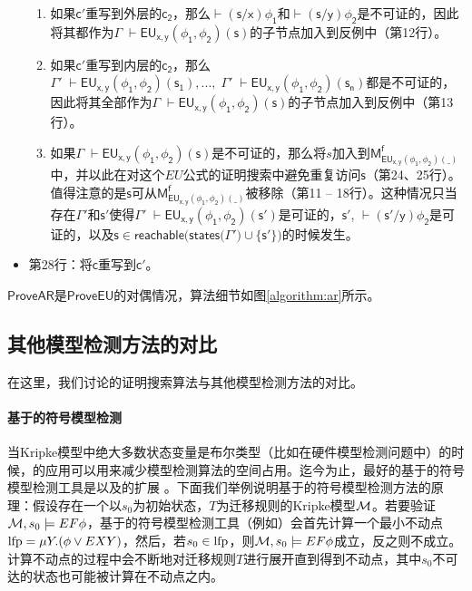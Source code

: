 \begin{itemize}
\begin{enumerate}
		\item 如果$\mathsf{c'}$重写到外层的$\mathsf{c_2}$，那么$\mathsf{\vdash (s/x)\phi_1}$和$\mathsf{\vdash (s/y)\phi_2}$是不可证的，因此将其都作为$\Gamma\;\mathsf{\vdash EU_{x,y}(\phi_1,\phi_2)(s)}$的子节点加入到反例中（第12行）。
		\item 如果$\mathsf{c'}$重写到内层的$\mathsf{c_2}$，那么$\Gamma'\;\mathsf{\vdash EU_{x,y}(\phi_1,\phi_2)(s_1)},...,\;\Gamma'\;\mathsf{\vdash EU_{x,y}(\phi_1,\phi_2)(s_n)}$都是不可证的，因此将其全部作为$\Gamma\;\mathsf{\vdash EU_{x,y}(\phi_1,\phi_2)(s)}$的子节点加入到反例中（第13行）。
		\item 如果$\Gamma\;\mathsf{\vdash EU_{x,y}(\phi_1,\phi_2)(s)}$是不可证的，那么将$s$加入到$\mathsf{M_{EU_{x,y}(\phi_1,\phi_2)(\_)}^f}$中，并以此在对这个$EU$公式的证明搜索中避免重复访问$\mathsf{s}$（第24、25行）。值得注意的是$\mathsf{s}$可从$\mathsf{M_{EU_{x,y}(\phi_1,\phi_2)(\_)}^f}$被移除（第11 -- 18行）。这种情况只当存在${\Gamma'}$和$\mathsf{s'}$使得$\Gamma'\;\mathsf{\vdash EU_{x,y}(\phi_1,\phi_2)(s')}$是可证的，$\mathsf{s'}$, $\mathsf{\vdash (s'/y)\phi_2}$是可证的，以及$\mathsf{s\in reachable(states(}\Gamma'\mathsf{)\cup \{s'\})}$的时候发生。
		
	\end{enumerate}
	\item 第28行：将$\mathsf{c}$重写到$\mathsf{c'}$。
\end{itemize}

$\mathsf{ProveAR}$是$\mathsf{ProveEU}$的对偶情况，算法细节如图\ref{algorithm:ar}所示。


\subsection{其他\CTLP{}模型检测方法的对比}
在这里，我们讨论\sctlprov{}的证明搜索算法与其他\CTLP{}模型检测方法的对比。

\paragraph{基于\BDD{}的符号模型检测}
当Kripke模型中绝大多数状态变量是布尔类型（比如在硬件模型检测问题中）的时候，\BDD{}的应用可以用来减少模型检测算法的空间占用。迄今为止，最好的基于\BDD{}的符号模型检测工具是\nusmv{}\cite{mcmillan93,CimattiCGR99}以及\nusmv{}的扩展\nuxmv{} \cite{CAVCDGMMMRT14}。下面我们举例说明基于\BDD{}的符号模型检测方法的原理：假设存在一个以$s_0$为初始状态，$T$为迁移规则的Kripke模型$\cal M$。若要验证${\cal M},s_0\models EF\phi$，基于\BDD{}的符号模型检测工具（例如\nusmv{}）会首先计算一个最小不动点$\textup{lfp}=\mu Y. (\phi\vee EXY)$，然后，若$s_0\in \textup{lfp}$，则${\cal M},s_0\models EF\phi$成立，反之则不成立。计算不动点的过程中会不断地对迁移规则$T$进行展开直到得到不动点，其中$s_0$不可达的状态也可能被计算在不动点之内。

